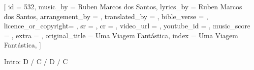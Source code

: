 [
    id                  = {532},
    music_by            = {Ruben Marcos dos Santos}, %
    lyrics_by           = {Ruben Marcos dos Santos}, %
    arrangement_by      = {}, %
    translated_by       = {}, %
    bible_verse         = {},
    licence_or_copyright= {},
    sr                  = {},
    cr                  = {},
    video_url           = {}, %
    youtube_id          = {}, %
    music_score         = {}, %
    extra               = {},
    original_title      = {Uma Viagem Fantástica}, %
    index               = {Uma Viagem Fantástica},
]

\beginverse
Intro:
D / C / D / C
\endverse

\beginverse

